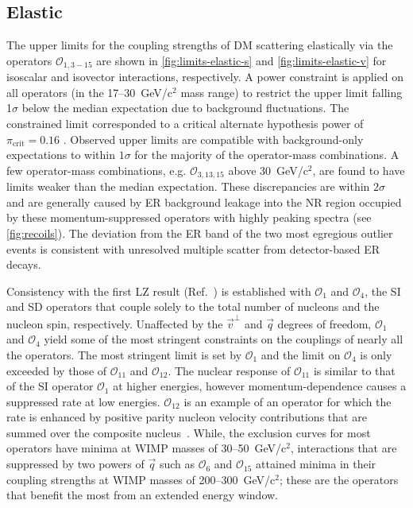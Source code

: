 \documentclass[reprint, showpacs,
preprintnumbers,
amsmath,amssymb,
aps, floatfix,
superscriptaddress,
prd, nofootinbib]{revtex4-1}
\begin{document}
\subsection{Elastic}\label{subsec:elastic}
\par
The upper limits for the coupling strengths of DM scattering elastically via the operators $\mathcal{O}_{1,3-15}$ are shown in \autoref{fig:limits-elastic-s} and \autoref{fig:limits-elastic-v} for isoscalar and isovector interactions, respectively. 
A power constraint is applied on all operators (in the 17--30~GeV/c$^2$ mass range) to restrict the upper limit falling 1$\sigma$ below the median expectation due to background fluctuations. 
The constrained limit corresponded to a critical alternate hypothesis power of $\pi_\text{crit} = 0.16$ \cite{LZ:SR1WS_2022, DM_parameters:BAXTER2021_Conventions, Cowan:2011_power_constraints}.
Observed upper limits are compatible with background-only expectations to within $1\sigma$ for the majority of the operator-mass combinations.
A few operator-mass combinations, e.g. $\mathcal{O}_{3, 13, 15}$ above 30~GeV/c$^2$, are found to have limits weaker than the median expectation.
These discrepancies are within $2\sigma$ and are generally caused by ER background leakage into the NR region occupied by these momentum-suppressed operators with highly peaking spectra (see \autoref{fig:recoils}).
The deviation from the ER band of the two most egregious outlier events is consistent with unresolved multiple scatter from detector-based ER decays.
\par
Consistency with the first LZ result (Ref.~\cite{LZ:SR1WS_2022}) is established with $\mathcal{O}_1$ and $\mathcal{O}_4$, the SI and SD operators that couple solely to the total number of nucleons and the nucleon spin, respectively.
Unaffected by the $\vec{v}^\perp$ and $\vec{q}$ degrees of freedom, $\mathcal{O}_1$ and $\mathcal{O}_4$ yield some of the most stringent constraints on the couplings of nearly all the operators.
The most stringent limit is set by $\mathcal{O}_1$ and the limit on $\mathcal{O}_4$ is only exceeded by those of $\mathcal{O}_{11}$ and $\mathcal{O}_{12}$. 
The nuclear response of $\mathcal{O}_{11}$ is similar to that of the SI operator $\mathcal{O}_1$ at higher energies, however momentum-dependence causes a suppressed rate at low energies. 
$\mathcal{O}_{12}$ is an example of an operator for which the rate is enhanced by positive parity nucleon velocity contributions that are summed over the composite nucleus~\cite{Anand:MathematicaEFT}. 
While, the exclusion curves for most operators have minima at WIMP masses of 30--50~GeV/c$^2$, interactions that are suppressed by two powers of $\vec{q}$ such as $\mathcal{O}_6$ and $\mathcal{O}_{15}$ attained minima in their coupling strengths at WIMP masses of 200--300~GeV/c$^2$; these are the operators that benefit the most from an extended energy window.
\end{document}
